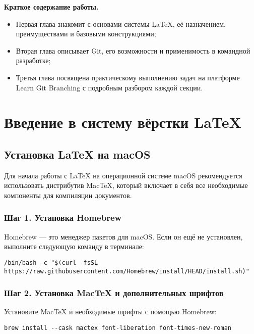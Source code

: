 \documentclass[a4paper,12pt]{report}
\begin{document}
\textbf{Краткое содержание работы.}

\begin{itemize}
  \item Первая глава знакомит с основами системы \LaTeX{}, её назначением, преимуществами и базовыми конструкциями;
  \item Вторая глава описывает Git, его возможности и применимость в командной разработке;
  \item Третья глава посвящена практическому выполнению задач на платформе Learn Git Branching с подробным разбором каждой секции.
\end{itemize}


\chapter{Введение в систему вёрстки \LaTeX}\label{latex_introduction}

\section{Установка \LaTeX{} на macOS}

Для начала работы с \LaTeX{} на операционной системе macOS рекомендуется использовать дистрибутив MacTeX, который включает в себя все необходимые компоненты для компиляции документов.

\subsection*{Шаг 1. Установка Homebrew}

Homebrew — это менеджер пакетов для macOS. Если он ещё не установлен, выполните следующую команду в терминале:

\begin{verbatim}
/bin/bash -c "$(curl -fsSL https://raw.githubusercontent.com/Homebrew/install/HEAD/install.sh)"
\end{verbatim}

\subsection*{Шаг 2. Установка MacTeX и дополнительных шрифтов}

Установите MacTeX и необходимые шрифты с помощью Homebrew:

\begin{verbatim}
brew install --cask mactex font-liberation font-times-new-roman
\end{verbatim}
\end{document}
